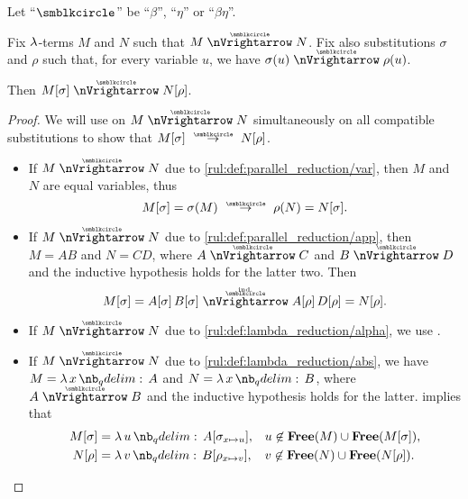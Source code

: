 \begin{proposition}\label{thm:substitution_on_parallel_reduction}
  Let \enquote{\( {\anon} \)} be \enquote{\( \beta \)}, \enquote{\( \eta \)} or \enquote{\( \beta\eta \)}.

  Fix \( \mathrm{\lambda} \)-terms \( M \) and \( N \) such that \( M \ppred N \). Fix also substitutions \( \sigma \) and \( \rho \) such that, for every variable \( u \), we have \( \sigma(u) \ppred \rho(u) \).

  Then \( M[\sigma] \ppred N[\rho] \).
\end{proposition}
\begin{proof}
  We will use  on \( M \ppred N \) simultaneously on all compatible substitutions to show that \( M[\sigma] \pred N[\rho] \).
  \begin{itemize}
    \item If \( M \ppred N \) due to \ref{rul:def:parallel_reduction/var}, then \( M \) and \( N \) are equal variables, thus
    \begin{equation*}
      M[\sigma] = \sigma(M) \pred \rho(N) = N[\sigma].
    \end{equation*}

    \item If \( M \ppred N \) due to \ref{rul:def:parallel_reduction/app}, then \( M = AB \) and \( N = CD \), where \( A \ppred C \) and \( B \ppred D \) and the inductive hypothesis holds for the latter two. Then
    \begin{equation*}
      M[\sigma]
      =
      A[\sigma] \thinspace B[\sigma]
      \reloset {\T{ind.}} \ppred
      A[\rho] \thinspace D[\rho]
      =
      N[\rho].
    \end{equation*}

    \item If \( M \ppred N \) due to \ref{rul:def:lambda_reduction/alpha}, we use .

    \item If \( M \ppred N \) due to \ref{rul:def:lambda_reduction/abs}, we have \( M = \qabs x A \) and \( N = \qabs x B \), where \( A \ppred B \) and the inductive hypothesis holds for the latter.  implies that
    \begin{align*}
      M[\sigma] &= \qabs u A[\sigma_{x \mapsto u}], &&u \not\in \op*{Free}(M) \cup \op*{Free}(M[\sigma]), \\
      N[\rho]   &= \qabs v B[\rho_{x \mapsto v}],   &&v \not\in \op*{Free}(N) \cup \op*{Free}(N[\rho]).
    \end{align*}


\end{itemize}
\end{proof}
